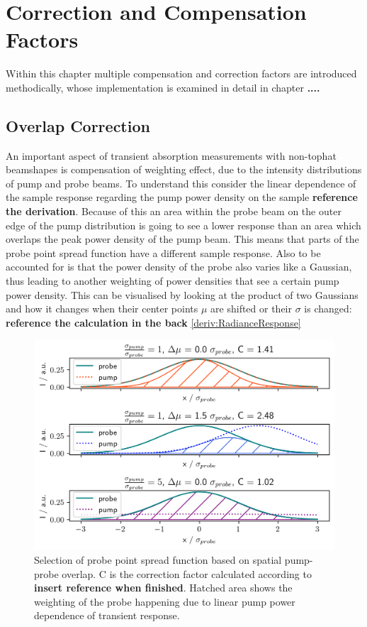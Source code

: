 \documentclass[twoside,openright]{scrreprt}
\begin{document}
\chapter{Correction and Compensation Factors}\label{chap:CorrandComp}
Within this chapter multiple compensation and correction factors are introduced methodically, whose implementation is examined in detail in chapter \textbf{....}
\section{Overlap Correction}
An important aspect of transient absorption measurements with non-tophat beamshapes is compensation of weighting effect, due to the intensity distributions of pump and probe beams. To understand this consider the linear dependence of the sample response regarding the pump power density on the sample \textbf{reference the derivation}. Because of this an area within the probe beam on the outer edge of the pump distribution is going to see a lower response than an area which overlaps the peak power density of the pump beam. This means that parts of the probe point spread function have a different sample response. Also to be accounted for is that the power density of the probe also varies like a Gaussian, thus leading to another weighting of power densities that see a certain pump power density.
This can be visualised by looking at the product of two Gaussians and how it changes when their center points $\mu$ are shifted or their $\sigma$ is changed:\\ 
\textbf{reference the calculation in the back} \ref{deriv:RadianceResponse}

\begin{figure}[!hb]
\centering
\includegraphics[scale=1]{images/OverlapVisualisationProbeSelection.png}
\caption{Selection of probe point spread function based on spatial pump-probe overlap. C is the correction factor calculated according to \textbf{insert reference when finished}. Hatched area shows the weighting of the probe happening due to linear pump power dependence of transient response.}
\end{figure}
\end{document}
